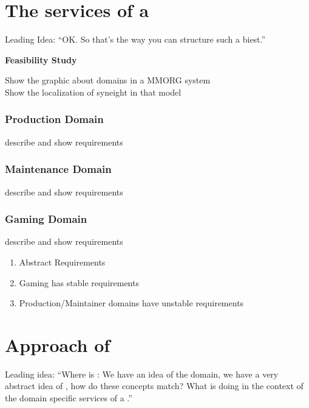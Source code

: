 \section{The services of a \MMORG}
Leading Idea: ``OK. So that's the way you can structure such a
biest.''

\textbf{Feasibility Study}

Show the graphic about domains in a MMORG system\\ Show the
localization of syneight in that model

\subsubsection{Production Domain}

describe and show requirements

\subsubsection{Maintenance Domain}

describe and show requirements

\subsubsection{Gaming Domain}

describe and show requirements

\begin{enumerate}
\item Abstract Requirements
\item Gaming has stable requirements
\item Production/Maintainer domains have unstable requirements
\end{enumerate}

\section{Approach of \SYNEIGHT}
Leading idea: ``Where is \SYNEIGHT: We have an idea of the domain, we
have a very abstract idea of \SYNEIGHT, how do these concepts match?
What is \SYNEIGHT doing in the context of the domain specific services
of a \MMORG.''

